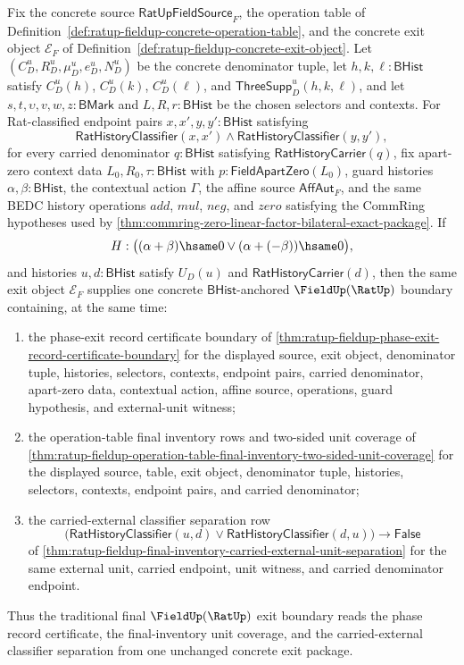 \begin{theorem}
\label{thm:ratup-fieldup-final-inventory-phase-exit-boundary}
Fix the concrete source $\mathsf{RatUpFieldSource}_F$, the operation table of
Definition~\ref{def:ratup-fieldup-concrete-operation-table}, and the concrete
exit object $\mathcal E_F$ of
Definition~\ref{def:ratup-fieldup-concrete-exit-object}. Let
$(C_D^u,R_D^u,\mu_D^u,e_D^u,N_D^u)$ be the concrete denominator tuple, let
$h,k,\ell:\mathsf{BHist}$ satisfy $C_D^u(h)$, $C_D^u(k)$, $C_D^u(\ell)$, and
$\mathsf{ThreeSupp}_D^u(h,k,\ell)$, and let
$s,t,\upsilon,v,w,z:\mathsf{BMark}$ and $L,R,r:\mathsf{BHist}$ be the chosen
selectors and contexts. For Rat-classified endpoint pairs
$x,x',y,y':\mathsf{BHist}$ satisfying
$$
\mathsf{RatHistoryClassifier}(x,x')
\land
\mathsf{RatHistoryClassifier}(y,y'),
$$
for every carried denominator $q:\mathsf{BHist}$ satisfying
$\mathsf{RatHistoryCarrier}(q)$, fix apart-zero context data
$L_0,R_0,\tau:\mathsf{BHist}$ with $p:\mathsf{FieldApartZero}(L_0)$, guard
histories $\alpha,\beta:\mathsf{BHist}$, the contextual action $\Gamma$, the
affine source $\mathsf{AffAut}_F$, and the same BEDC history operations $add$,
$mul$, $neg$, and $zero$ satisfying the CommRing hypotheses used by
\autoref{thm:commring-zero-linear-factor-bilateral-exact-package}. If
$$
H:\bigl((\alpha+\beta)\hsame0 \lor (\alpha+(-\beta))\hsame0\bigr),
$$
and histories $u,d:\mathsf{BHist}$ satisfy $U_D(u)$ and
$\mathsf{RatHistoryCarrier}(d)$, then the same exit object $\mathcal E_F$
supplies one concrete $\mathsf{BHist}$-anchored $\FieldUp(\RatUp)$ boundary
containing, at the same time:
\begin{enumerate}
  \item the phase-exit record certificate boundary of
  \autoref{thm:ratup-fieldup-phase-exit-record-certificate-boundary} for the
  displayed source, exit object, denominator tuple, histories, selectors,
  contexts, endpoint pairs, carried denominator, apart-zero data, contextual
  action, affine source, operations, guard hypothesis, and external-unit
  witness;
  \item the operation-table final inventory rows and two-sided unit coverage of
  \autoref{thm:ratup-fieldup-operation-table-final-inventory-two-sided-unit-coverage}
  for the displayed source, table, exit object, denominator tuple, histories,
  selectors, contexts, endpoint pairs, and carried denominator;
  \item the carried-external classifier separation row
  $$
  \bigl(
  \mathsf{RatHistoryClassifier}(u,d)\lor
  \mathsf{RatHistoryClassifier}(d,u)
  \bigr)\to\mathsf{False}
  $$
  of
  \autoref{thm:ratup-fieldup-final-inventory-carried-external-unit-separation}
  for the same external unit, carried endpoint, unit witness, and carried
  denominator endpoint.
\end{enumerate}
Thus the traditional final $\FieldUp(\RatUp)$ exit boundary reads the phase
record certificate, the final-inventory unit coverage, and the carried-external
classifier separation from one unchanged concrete exit package.
\end{theorem}
